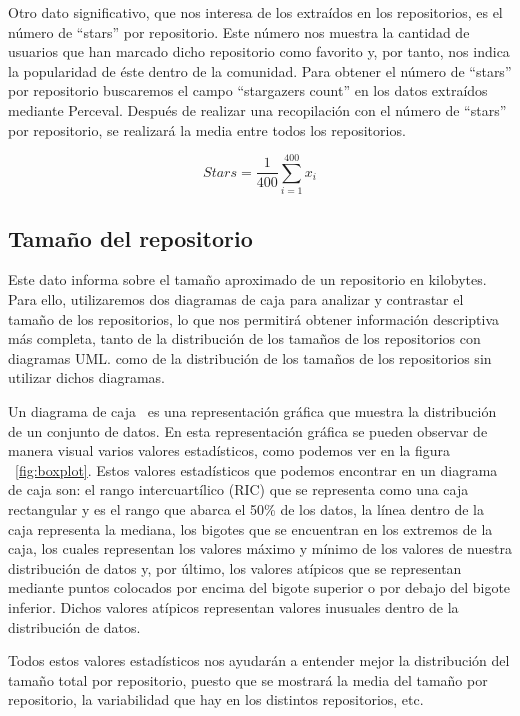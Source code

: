 \documentclass[a4paper, 12pt]{book}
\begin{document}
Otro dato significativo, que nos interesa de los extraídos en los repositorios, es el número de ``stars'' por repositorio.
Este número nos muestra la cantidad de usuarios que han marcado dicho repositorio como favorito y, por tanto, nos indica la popularidad de éste dentro de la comunidad. 
Para obtener el número de ``stars'' por repositorio buscaremos el campo ``stargazers count'' en los datos extraídos mediante Perceval. 
Después de realizar una recopilación con el número de ``stars'' por repositorio, se realizará la media entre todos los repositorios.

\[{Stars} = \frac{1}{400} \sum_{i=1}^{400} x_i\]


\subsection{Tamaño del repositorio} %
\label{sec:tamaño del repositorio}
Este dato informa sobre el tamaño aproximado de un repositorio en kilobytes. 
Para ello, utilizaremos dos diagramas de caja para analizar y contrastar el tamaño de los repositorios, lo que nos permitirá obtener información descriptiva más completa, tanto de la distribución de los tamaños de los repositorios con diagramas UML. como de la distribución de los tamaños de los repositorios sin utilizar dichos diagramas.


Un diagrama de caja~\cite{neto2017boxplot} es una representación gráfica que muestra la distribución de un conjunto de datos.
En esta representación gráfica se pueden observar de manera visual varios valores estadísticos, como podemos ver en la figura ~\ref{fig:boxplot}.
Estos valores estadísticos que podemos encontrar en un diagrama de caja son: el rango intercuartílico (RIC) que se representa como una caja rectangular y es el rango que abarca el 50\% de los datos, la línea dentro de la caja representa la mediana, 
los bigotes que se encuentran en los extremos de la caja, los cuales representan los valores máximo y mínimo de los valores de nuestra distribución de datos y, por último, los valores atípicos que se representan mediante puntos colocados por encima del bigote superior o por debajo del bigote inferior.
Dichos valores atípicos representan valores inusuales dentro de la distribución de datos.


Todos estos valores estadísticos nos ayudarán a entender mejor la distribución del tamaño total por repositorio, puesto que se mostrará la media del tamaño por repositorio, la variabilidad que hay en los distintos repositorios, etc.
\end{document}
